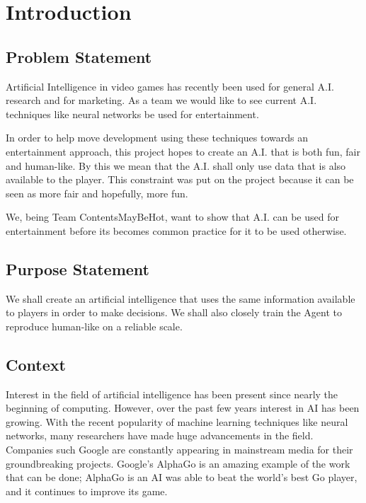 \chapter{Introduction}


\section{Problem Statement}

Artificial Intelligence in video games has recently been used for general A.I. research and for marketing. As a team we would like to see current A.I. techniques like neural networks be used for entertainment.

In order to help move development using these techniques towards an entertainment approach, this project hopes to create an A.I. that is both fun, fair and human-like. By this we mean that the A.I. shall only use data that is also available to the player. This constraint was put on the project because it can be seen as more fair and hopefully, more fun.

We, being Team ContentsMayBeHot, want to show that A.I. can be used for entertainment before its becomes common practice for it to be used otherwise.



\section{Purpose Statement}

We shall create an artificial intelligence that uses the same information available to players in order to make decisions. We shall also closely train the Agent to reproduce human-like on a reliable scale.





\section{Context}

Interest in the field of artificial intelligence has been present since nearly the beginning of computing. However, over the past few years interest in AI has been growing. With the recent popularity of machine learning techniques like neural networks, many researchers have made huge advancements in the field. Companies such Google are constantly appearing in mainstream media for their groundbreaking projects. Google's AlphaGo is an amazing example of the work that can be done; AlphaGo is an AI was able to beat the world's best Go player, and it continues to improve its game.

